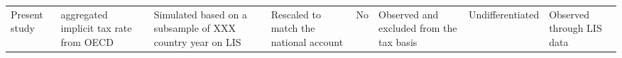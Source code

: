 \begin{table}[]
\begin{tabular}{llllllll}
Present study                                                     & aggregated implicit tax rate from OECD & Simulated based on a subsample of XXX country year on LIS                      & Rescaled to match the national account                                                           & No                                                & Observed and excluded from the tax basis & Undifferentiated                 & Observed through LIS data                                                  
\end{tabular}
\end{table}